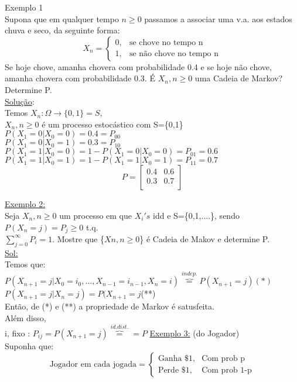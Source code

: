 \documentclass[a4paper,12pt]{article}
\begin{document}
Exemplo 1\\
Supona que em qualquer tempo $n\ge0$ passamos a associar uma v.a. aos estados chuva e seco, da seguinte forma:\\
\begin{equation*}
X_n=
\begin{cases}
0, & \text{se chove no tempo n}\ \\
1, & \text{se n\~ao chove no tempo n}
\end{cases}
\end{equation*}
Se hoje chove, amanha chovera com probabilidade 0.4 e se hoje n\~ao chove, amanha chovera com probabilidade 0.3.
\'E ${X_n,n\ge0}$ uma Cadeia de Markov? Determine P.\\
\underline{Solução}:\\
Temos $X_n:\Omega \longrightarrow \{0,1\}=S,$\\
${X_n,n\ge0} $ \'e um processo estoc\'astico com S=\{0,1\}\\
$P(X_1=0|X_0=0)=0.4=P_{00}$\\
$P(X_1=0|X_0=1)=0.3=P_{10}$\\
$P(X_1=1|X_0=0)=1-P(X_1=0|X_0=0)=P_{01}=0.6 $\\
$P(X_1=1|X_0=1)=1-P(X_1=1|X_0=1)=P_{11}=0.7$\\
 \[
P=
\left[ {\begin{array}{cc}
	0.4 & 0.6 \\
	0.3 & 0.7 \\
	\end{array} } \right]
\]

\newpage
\underline{Exemplo 2:}\\
Seja ${X_n,n\ge0}$ um processo em que $X_i's$ idd e S=\{0,1,....\}, sendo $P(X_n=j)=P_j\ge0$ t.q.\\
$\mathop\sum_{j=0}^{\infty} P_i=1$. Mostre que \{$Xn,n\ge0$\} \'e Cadeia de Makov e determine P.\\
\underline{Sol:}\\
Temos que:\\
$P(X_{n+1}=j|X_0=i_0,...,X_{n-1}=i_{n-1},X_n=i)\overbrace{=}^{indep.}P(X_{n+1}=j)(*)$\\
$P(X_{n+1}=j|X_n=j)=P(X_{n+1}=j$(**)\\
Ent\~ao, de (*) e (**) a propriedade de Markov \'e satusfeita.\\
Al\'em disso,\\
i, fixo : $P_{ij}=P(X_{n+1}=j)\overbrace{=}^{id. dist.}=P$
\newpage
\underline{Exemplo 3:} (do Jogador)\\
Suponha que:\\
\begin{equation*}
\text{Jogador em cada jogada}=
\begin{cases}
\text{Ganha \$1}, & \text{Com prob p} \\
\text{Perde \$1}, & \text{Com prob 1-p}
\end{cases}
\end{equation*}
\end{document}
